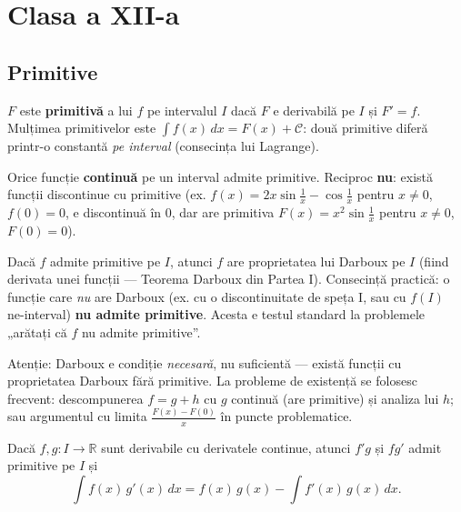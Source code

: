\chapter{Clasa a XII-a}

\section{Primitive}

\begin{definitie}
$F$ este \textbf{primitivă} a lui $f$ pe intervalul $I$ dacă $F$ e derivabilă pe $I$ și $F'=f$. Mulțimea primitivelor este $\int f(x)\,dx=F(x)+\mathcal{C}$: două primitive diferă printr-o constantă \emph{pe interval} (consecința lui Lagrange).
\end{definitie}

\begin{teorema}[Existența]
Orice funcție \textbf{continuă} pe un interval admite primitive. Reciproc \textbf{nu}: există funcții discontinue cu primitive (ex. $f(x)=2x\sin\frac1x-\cos\frac1x$ pentru $x \neq 0$, $f(0)=0$, e discontinuă în $0$, dar are primitiva $F(x)=x^2\sin\frac1x$ pentru $x\neq0$, $F(0)=0$).
\end{teorema}

\begin{teorema}
Dacă $f$ admite primitive pe $I$, atunci $f$ are proprietatea lui Darboux pe $I$ (fiind derivata unei funcții --- Teorema Darboux din Partea I). Consecință practică: o funcție care \emph{nu} are Darboux (ex. cu o discontinuitate de speța I, sau cu $f(I)$ ne-interval) \textbf{nu admite primitive}. Acesta e testul standard la problemele „arătați că $f$ nu admite primitive''.
\end{teorema}

\begin{obs}
Atenție: Darboux e condiție \emph{necesară}, nu suficientă --- există funcții cu proprietatea Darboux fără primitive. La probleme de existență se folosesc frecvent: descompunerea $f=g+h$ cu $g$ continuă (are primitive) și analiza lui $h$; sau argumentul cu limita $\frac{F(x)-F(0)}{x}$ în puncte problematice.
\end{obs}

\begin{teorema}
Dacă $f,g:I\to\mathbb{R}$ sunt derivabile cu derivatele continue, atunci $f'g$ și $fg'$ admit primitive pe $I$ și
\[
\int f(x)\,g'(x)\,dx=f(x)\,g(x)-\int f'(x)\,g(x)\,dx.
\]
\end{teorema}

